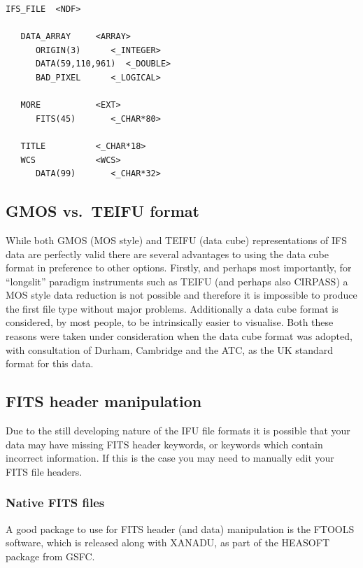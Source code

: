 \documentclass[twoside,11pt]{article}
\newcommand{\htmladdnormallink}[2]{#1}
\newcommand{\xlabel}[1]{}
\begin{document}
\small\begin{verbatim}
IFS_FILE  <NDF>

   DATA_ARRAY     <ARRAY>        
      ORIGIN(3)      <_INTEGER>   
      DATA(59,110,961)  <_DOUBLE>   
      BAD_PIXEL      <_LOGICAL>    

   MORE           <EXT>          
      FITS(45)       <_CHAR*80>    

   TITLE          <_CHAR*18>    
   WCS            <WCS>           
      DATA(99)       <_CHAR*32>   
\end{verbatim}\normalsize

\subsection{\xlabel{sc16_fits2ndf}GMOS vs.\ TEIFU format\label{sc16_fits2ndf}}

While both GMOS (MOS style) and TEIFU (data cube) representations of IFS data are perfectly valid there are several advantages to using the data cube format in preference to other options. Firstly, and perhaps most importantly, for ``longslit'' paradigm instruments such as TEIFU (and perhaps also CIRPASS) a MOS style data reduction is not possible and therefore it is impossible to produce  the first file type without major problems. Additionally a data cube format is considered, by most people, to be intrinsically easier to visualise. Both these reasons were taken under consideration when the data cube format was adopted, with consultation of Durham, Cambridge and the ATC, as the UK standard format for this data.

\subsection{\xlabel{sc16_fitshdr}FITS header manipulation\label{sc16_fitshdr}}

Due to the still developing nature of the IFU file formats it is possible that your data may have missing FITS header keywords, or keywords which contain incorrect information. If this is the case you may need to manually edit your FITS file headers.

\subsubsection{Native FITS files}
 
A good package to use for FITS header (and data) manipulation is the \htmladdnormallink{FTOOLS}{ http://heasarc.gsfc.nasa.gov/docs/software/lheasoft/ftools/} software, which is released along with \htmladdnormallink{XANADU}{http://heasarc.gsfc.nasa.gov/docs/software/lheasoft/xanadu/}, as part of the \htmladdnormallink{HEASOFT}{http://heasarc.gsfc.nasa.gov/docs/software/lheasoft/} package from GSFC.
\end{document}
